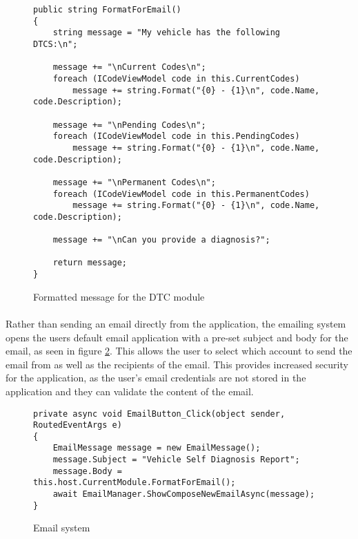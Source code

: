 {		\begin{figure}[h]
			\begin{lstlisting}
public string FormatForEmail()
{
	string message = "My vehicle has the following DTCS:\n";

	message += "\nCurrent Codes\n";
	foreach (ICodeViewModel code in this.CurrentCodes)
    	message += string.Format("{0} - {1}\n", code.Name, code.Description);

	message += "\nPending Codes\n";
	foreach (ICodeViewModel code in this.PendingCodes)
    	message += string.Format("{0} - {1}\n", code.Name, code.Description);

	message += "\nPermanent Codes\n";
	foreach (ICodeViewModel code in this.PermanentCodes)
    	message += string.Format("{0} - {1}\n", code.Name, code.Description);

	message += "\nCan you provide a diagnosis?";

	return message;
}
			\end{lstlisting}
			\caption{Formatted message for the DTC module}
			\label{code:EmailCodes}
		\end{figure}	
		
		\paragraph{}{
		Rather than sending an email directly from the application, the emailing system opens the users default email application with a pre-set subject and body for the email, as seen in figure \ref{code:Email}. This allows the user to select which account to send the email from as well as the recipients of the email. This provides increased security for the application, as the user's email credentials are not stored in the application and they can validate the content of the email.
		}		
		
		\begin{figure}[h]
			\begin{lstlisting}
private async void EmailButton_Click(object sender, RoutedEventArgs e)
{
	EmailMessage message = new EmailMessage();
	message.Subject = "Vehicle Self Diagnosis Report";            
    message.Body = this.host.CurrentModule.FormatForEmail();
	await EmailManager.ShowComposeNewEmailAsync(message);
}
			\end{lstlisting}
			\caption{Email system}
			\label{code:Email}
		\end{figure}	

}
